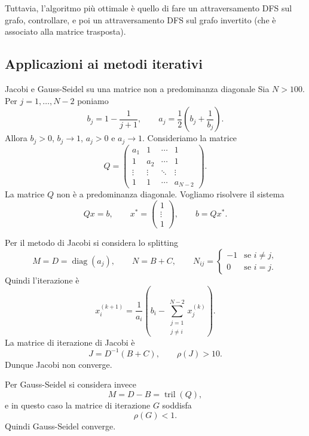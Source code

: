 \documentclass[a4paper]{article}
\begin{document}
Tuttavia, l'algoritmo più ottimale è quello
di fare un attraversamento DFS sul grafo, controllare, e poi un attraversamento DFS
sul grafo invertito (che è associato alla matrice trasposta).

\subsection{Applicazioni ai metodi iterativi}

\begin{snippetexample}{Jacobi e Gauss-Seidel su una matrice non a predominanza diagonale}
    Sia \(N>100\). Per \(j=1,\ldots,N-2\) poniamo
    \[
        b_j = 1-\frac{1}{j+1},
        \qquad
        a_j = \frac{1}{2}\left(b_j+\frac{1}{b_j}\right).
    \]
    Allora \(b_j>0\), \(b_j \to 1\), \(a_j>0\) e \(a_j \to 1\). Consideriamo la matrice
    \[
        Q =
        \begin{pmatrix}
            a_1 & 1 & \cdots & 1 \\
            1 & a_2 & \cdots & 1 \\
            \vdots & \vdots & \ddots & \vdots \\
            1 & 1 & \cdots & a_{N-2}
        \end{pmatrix}.
    \]
    La matrice \(Q\) non è a predominanza diagonale. Vogliamo risolvere il sistema
    \[
        Qx=b,
        \qquad
        x^\ast =
        \begin{pmatrix}
            1 \\
            \vdots \\
            1
        \end{pmatrix},
        \qquad
        b=Qx^\ast.
    \]

    Per il metodo di Jacobi si considera lo splitting
    \[
        M=D=\operatorname{diag}(a_j),
        \qquad
        N=B+C,
        \qquad
        N_{ij} =
        \begin{cases}
            -1 & \text{se } i\neq j,\\
            0 & \text{se } i=j.
        \end{cases}
    \]
    Quindi l'iterazione è
    \[
        x_i^{(k+1)}
        =
        \frac{1}{a_i}
        \left(
            b_i-\sum_{\substack{j=1\\ j\neq i}}^{N-2}x_j^{(k)}
        \right).
    \]
    La matrice di iterazione di Jacobi è
    \[
        J=D^{-1}(B+C),
        \qquad
        \rho(J)>10.
    \]
    Dunque Jacobi non converge.

    Per Gauss-Seidel si considera invece
    \[
        M=D-B=\operatorname{tril}(Q),
    \]
    e in questo caso la matrice di iterazione \(G\) soddisfa
    \[
        \rho(G)<1.
    \]
    Quindi Gauss-Seidel converge.
\end{snippetexample}
\end{document}
